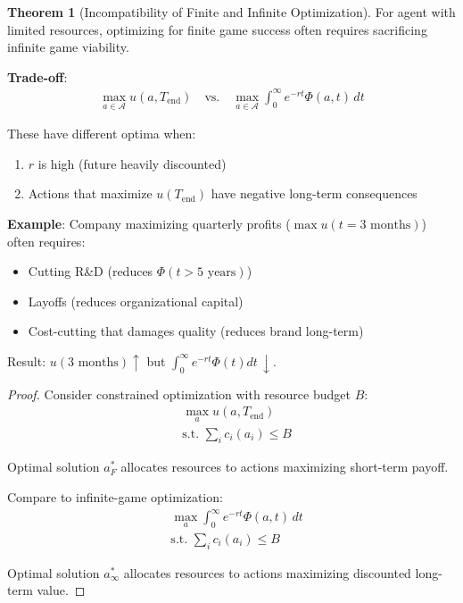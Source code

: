 \documentclass[11pt,a4paper]{article}
\theoremstyle{definition}
\newtheorem{theorem}{Theorem}[section]
\theoremstyle{remark}
\begin{document}
\begin{enumerate}
\begin{theorem}[Incompatibility of Finite and Infinite Optimization]
For agent with limited resources, optimizing for finite game success often requires sacrificing infinite game viability.

\textbf{Trade-off}:
\begin{align}
\max_{a \in \mathcal{A}} u(a, T_{\text{end}}) \quad \text{vs.} \quad \max_{a \in \mathcal{A}} \int_0^\infty e^{-rt} \Phi(a, t) \, dt
\end{align}

These have different optima when:
\begin{enumerate}
    \item \(r\) is high (future heavily discounted)
    \item Actions that maximize \(u(T_{\text{end}})\) have negative long-term consequences
\end{enumerate}

\textbf{Example}: Company maximizing quarterly profits (\(\max u(t=3 \text{ months})\)) often requires:
\begin{itemize}
    \item Cutting R\&D (reduces \(\Phi(t > 5 \text{ years})\))
    \item Layoffs (reduces organizational capital)
    \item Cost-cutting that damages quality (reduces brand long-term)
\end{itemize}

Result: \(u(3 \text{ months}) \uparrow\) but \(\int_0^\infty e^{-rt} \Phi(t) dt \, \downarrow\).
\end{theorem}

\begin{proof}
Consider constrained optimization with resource budget \(B\):
\begin{align}
&\max_{a} u(a, T_{\text{end}}) \\
&\text{s.t. } \sum_i c_i(a_i) \leq B
\end{align}

Optimal solution \(a^*_F\) allocates resources to actions maximizing short-term payoff.

Compare to infinite-game optimization:
\begin{align}
&\max_{a} \int_0^\infty e^{-rt} \Phi(a, t) \, dt \\
&\text{s.t. } \sum_i c_i(a_i) \leq B
\end{align}

Optimal solution \(a^*_\infty\) allocates resources to actions maximizing discounted long-term value.


\end{proof}
\end{enumerate}
\end{document}
